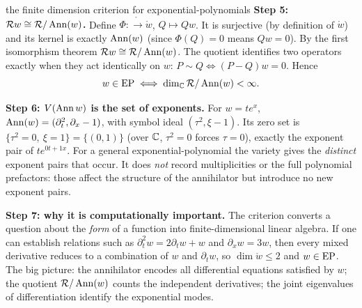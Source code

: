\begin{explained}{the finite dimension criterion for exponential-polynomials}
\medskip\textbf{Step 5: $\mathcal{R} w\cong\mathcal{R}/\operatorname{Ann}(w)$.} Define $\Phi:\ring\to\ring w$, $Q\mapsto Qw$. It is surjective (by definition of $\ring w$) and its kernel is exactly $\operatorname{Ann}(w)$ (since $\Phi(Q)=0$ means $Qw=0$). By the first isomorphism theorem $\mathcal{R} w\cong\mathcal{R}/\operatorname{Ann}(w)$. The quotient identifies two operators exactly when they act identically on $w$: $P\sim Q\iff(P-Q)w=0$. Hence
\[
w\in\mathrm{EP}\iff\dim_{\mathbb{C}}\mathcal{R}/\operatorname{Ann}(w)<\infty .
\]

\medskip\textbf{Step 6: $V(\operatorname{Ann} w)$ is the set of exponents.} For $w=te^x$, $\operatorname{Ann}(w)=(\partial_t^2,\partial_x-1)$, with symbol ideal $(\tau^2,\xi-1)$. Its zero set is $\{\tau^2=0,\ \xi=1\}=\{(0,1)\}$ (over $\mathbb{C}$, $\tau^2=0$ forces $\tau=0$), exactly the exponent pair of $te^{0t+1x}$. For a general exponential-polynomial the variety gives the \emph{distinct} exponent pairs that occur. It does \emph{not} record multiplicities or the full polynomial prefactors: those affect the structure of the annihilator but introduce no new exponent pairs.

\medskip\textbf{Step 7: why it is computationally important.} The criterion converts a question about the \emph{form} of a function into finite-dimensional linear algebra. If one can establish relations such as $\partial_t^2w=2\partial_tw+w$ and $\partial_xw=3w$, then every mixed derivative reduces to a combination of $w$ and $\partial_tw$, so $\dim\ring w\le2$ and $w\in\mathrm{EP}$. The big picture: the annihilator encodes all differential equations satisfied by $w$; the quotient $\mathcal{R}/\operatorname{Ann}(w)$ counts the independent derivatives; the joint eigenvalues of differentiation identify the exponential modes.
\end{explained}
